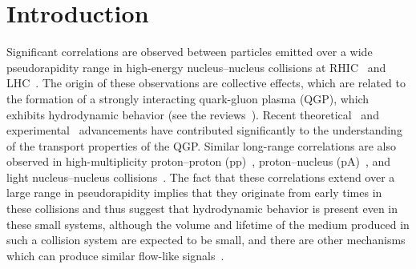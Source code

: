 
\section{Introduction}
\label{sec:intro}

Significant correlations are observed between particles emitted over a wide pseudorapidity range in high-energy nucleus--nucleus collisions at RHIC~\cite{Adams:2005dq,Adcox:2004mh,Arsene:2004fa,Back:2004je} and LHC~\cite{Abelev:2012di, Abelev:2014pua, ATLAS:2011ah}. The origin of these observations are collective effects, which are related to the formation of a strongly interacting quark-gluon plasma (QGP), which exhibits hydrodynamic behavior (see the reviews~\cite{Romatschke:2007mq,Jeon:2015dfa,Romatschke:2017ejr}). Recent theoretical~\cite{Niemi:2015qia,Bernhard:2016tnd,Bernhard:2019bmu} and experimental~\cite{ALICE:2016kpq,Acharya:2017gsw,Acharya:2017zfg,Acharya:2020taj} advancements have contributed significantly to the understanding of the transport properties of the QGP.
Similar long-range correlations are also observed in high-multiplicity proton--proton (pp)~\cite{Aad:2015gqa,Khachatryan:2015lva,Khachatryan:2016txc,Acharya:2019vdf}, proton--nucleus (pA)~\cite{Abelev:2012ola,Aad:2014lta,Aaboud:2016yar,Khachatryan:2016ibd}, and light nucleus--nucleus collisions~\cite{PHENIX:2018lia,Aidala:2017ajz}. The fact that these correlations extend over a large range in pseudorapidity implies that they originate from early times in these collisions and thus suggest that hydrodynamic behavior is present even in these small systems, although the volume and lifetime of the medium produced in such a collision system are expected to be small, and there are other mechanisms which can produce similar flow-like signals~\cite{Busza:2018rrf,Nagle:2018nvi}.

